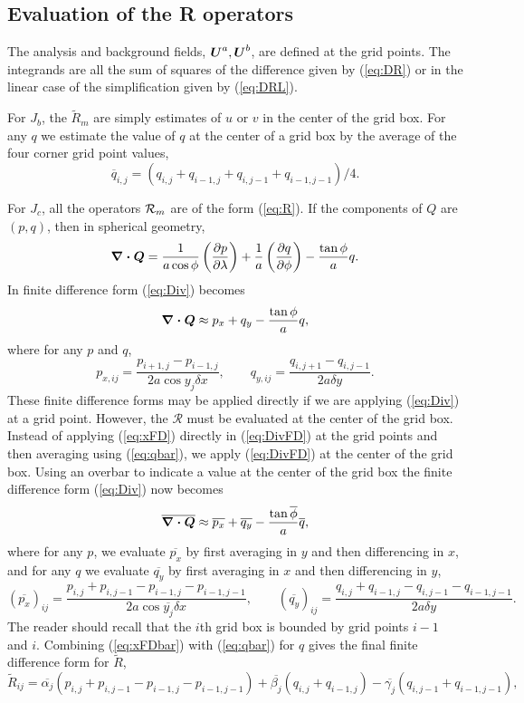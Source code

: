 \documentclass[11pt]{article}
\newcommand{\Dot}[2]{\Vector{{#1} \cdot {#2}}}
\newcommand{\J}[1]{\mbox{$ J_{#1} $}}
\newcommand{\Vector}[1]{\mbox{\boldmath ${#1}$}}
\newcommand{\xxx}[1]{\subsection {#1}}
\newcommand{\eql}[2]{\begin{equation} \label{eq:#1} #2 \end{equation}}
\newcommand{\eqr}[1]{(\ref{eq:#1})}
\newcommand{\Operator}[1]{\mbox{$ \mathcal #1 $}}
\newcommand{\DpDp}[2]{ \frac{\partial #1}{\partial #2} }
\begin{document}
\xxx {Evaluation of the R operators}

The analysis and background fields, $ \Vector{U}^a, \Vector{U}^b $,
are defined at the grid points.  The integrands are all the sum of
squares of the difference given by \eqr{DR} or in the linear case of
the simplification given by \eqr{DRL}.

For \J{b}, the $ \tilde{R}_m $ are simply estimates of $u$ or $v$
in the center of the grid box.  For
any $q$ we estimate the value of $q$ at the center of a grid box by
the average of the four corner grid point values,
 \eql{qbar}{ \overline{q}_{i,j} =
  (q_{i,j} + q_{i-1,j} + q_{i,j-1} + q_{i-1,j-1})/4 .}

For \J{c}, all the operators $ \Operator{R}_m $ are of the form \eqr{R}.
 If the components of \Vector{Q} are $(p,q)$, then in spherical
geometry,
 \eql{Div}{ \Dot{\nabla}{Q} =
  \frac{1}{a \cos \phi} \left( \DpDp{p}{\lambda} \right) +
  \frac{1}{a} \left( \DpDp{q}{\phi} \right) - \frac{\tan \phi}{a} q . }
 In finite difference form \eqr{Div} becomes
 \eql{DivFD}{ \Dot{\nabla}{Q} \approx p_x + q_y - \frac{\tan \phi}{a} q , }
 where for any $p$ and $q$,
 \eql{xFD}{ p_{x,ij} = \frac{p_{i+1,j} - p_{i-1,j}}{2 a \cos y_j \delta x},
  \qquad  q_{y,ij} = \frac{q_{i,j+1} - q_{i,j-1}}{2 a \delta y} . }
 These finite difference forms may be applied directly if we are
applying \eqr{Div} at a grid point.  However, the \Operator{R} must be
evaluated at the center of the grid box.  Instead of applying
\eqr{xFD} directly in \eqr{DivFD} at the grid points and then
averaging using \eqr{qbar}, we apply \eqr{DivFD} at the center of the
grid box.  Using an overbar to indicate a value at the center of the
grid box the finite difference form \eqr{Div} now becomes
 \eql{DivFDbar}{ \overline{\Dot{\nabla}{Q}} \approx \overline{p_x} 
  + \overline{q_y} - \frac{\tan \overline{\phi}}{a} \overline{q} , }
 where for any $p$, we evaluate $\overline{p_x}$ by first averaging in
$y$ and then differencing in $x$, and for any $q$ we evaluate
$\overline{q_y}$ by first averaging in $x$ and then differencing in
$y$,
 \eql{xFDbar}{ (\overline{p_x})_{ij} = \frac{p_{i,j} + p_{i,j-1} -
   p_{i-1,j} - p_{i-1,j-1}}{2 a \cos \overline{y_j} \delta x},
  \qquad   (\overline{q_y})_{ij} = \frac{q_{i,j} + q_{i-1,j} -
   q_{i,j-1} - q_{i-1,j-1}}{2 a \delta y} . }
 The reader should recall that the $i$th grid box is bounded by grid
points $i-1$ and $i$.
 Combining \eqr{xFDbar} with \eqr{qbar} for $q$ gives the final finite
difference form for $\tilde{R}$,
 \eql{tildeR}{\tilde{R}_{ij} = 
  \overline{\alpha_j} (p_{i,j} + p_{i,j-1} - p_{i-1,j} - p_{i-1,j-1}) +
  \overline{\beta_j} (q_{i,j} + q_{i-1,j}) - \overline{\gamma_j} (q_{i,j-1} + q_{i-1,j-1}) , }
\end{document}
